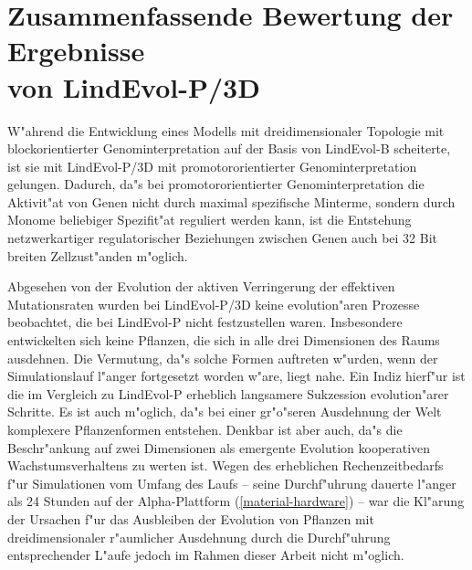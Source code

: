 \section[Zusammenfassung]{Zusammenfassende Bewertung der Ergebnisse \\ von LindEvol-P/3D}

W"ahrend die Entwicklung eines Modells mit dreidimensionaler Topologie mit blockorientierter Genominterpretation
auf der Basis von LindEvol-B scheiterte, ist sie mit LindEvol-P/3D mit promotororientierter Genominterpretation
gelungen. Dadurch, da"s bei promotororientierter Genominterpretation die Aktivit"at von Genen nicht durch
maximal spezifische Minterme, sondern durch Monome beliebiger Spezifit"at reguliert werden kann, ist die Entstehung
netzwerkartiger regulatorischer Beziehungen zwischen Genen auch bei 32 Bit breiten Zellzust"anden m"oglich.

Abgesehen von der Evolution der aktiven Verringerung der effektiven Mutationsraten wurden bei LindEvol-P/3D keine
evolution"aren Prozesse beobachtet, die bei LindEvol-P nicht festzustellen waren. Insbesondere entwickelten sich
keine Pflanzen, die sich in alle drei Dimensionen des Raums ausdehnen. Die Vermutung, da"s solche Formen auftreten
w"urden, wenn der Simulationslauf  l"anger fortgesetzt worden w"are, liegt nahe. Ein Indiz
hierf"ur ist die im Vergleich zu LindEvol-P erheblich langsamere Sukzession evolution"arer Schritte. Es ist
auch m"oglich, da"s bei einer gr"o"seren Ausdehnung der Welt komplexere Pflanzenformen entstehen. Denkbar ist aber auch,
da"s die Beschr"ankung auf zwei Dimensionen als emergente Evolution kooperativen Wachstumsverhaltens zu werten ist.
Wegen des erheblichen Rechenzeitbedarfs f"ur Simulationen vom Umfang des Laufs   -- seine Durchf"uhrung
dauerte l"anger als 24 Stunden auf der Alpha-Plattform (\ref{material-hardware}) -- war die Kl"arung der Ursachen
f"ur das Ausbleiben der Evolution von Pflanzen mit dreidimensionaler r"aumlicher Ausdehnung durch die Durchf"uhrung
entsprechender L"aufe jedoch im Rahmen dieser Arbeit nicht m"oglich.


